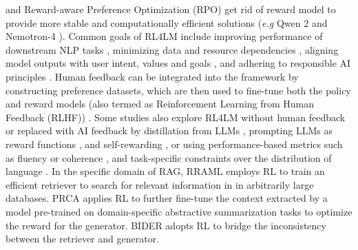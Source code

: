 and Reward-aware Preference Optimization (RPO) \cite{adler2024nemotron} get rid of reward model to provide more stable and computationally efficient solutions (\emph{e.g} Qwen 2 \cite{chu2024qwen2} and  Nemotron-4 \cite{adler2024nemotron}). Common goals of RL4LM include improving performance of downstream NLP tasks \cite{deng-etal-2022-rlprompt, ghalandari-etal-2022-efficient, ramamurthy2022reinforcement}, minimizing data and resource dependencies \cite{zhang2022tempera}, aligning model outputs with user intent, values and goals \cite{ouyang2022training}, and adhering to responsible AI principles \cite{bai2022training, bai2022constitutional}. Human feedback can be integrated into the framework by constructing preference datasets, which are then used to fine-tune both the policy and reward models (also termed as Reinforcement Learning from Human Feedback (RLHF)) \cite{bai2022training, ouyang2022training, hu2023aligning}. Some studies also explore RL4LM without human feedback \cite{rafailov2024direct} or replaced with AI feedback \cite{bai2022constitutional, yuan2024self} by distillation from LLMs \cite{cui2023ultrafeedback, park-etal-2024-offsetbias}, prompting LLMs as reward functions \cite{kwon2023reward, lee2023rlaif, zhang2024generative}, and self-rewarding \cite{yuan2024self}, or using performance-based metrics such as fluency or coherence \cite{ghalandari-etal-2022-efficient}, and task-specific constraints over the distribution of language \cite{ramamurthy2022reinforcement, wu2024beta}. In the specific domain of RAG, RRAML \cite{bacciu2023rraml} employs RL to train an efficient retriever to search for relevant information in in arbitrarily large databases. PRCA \cite{yang-etal-2023-prca} applies RL to further fine-tune the context extracted by a model pre-trained on domain-specific abstractive summarization tasks to optimize the reward for the generator. BIDER \cite{jin-etal-2024-bider} adopts RL to bridge the inconsistency between the retriever and generator.